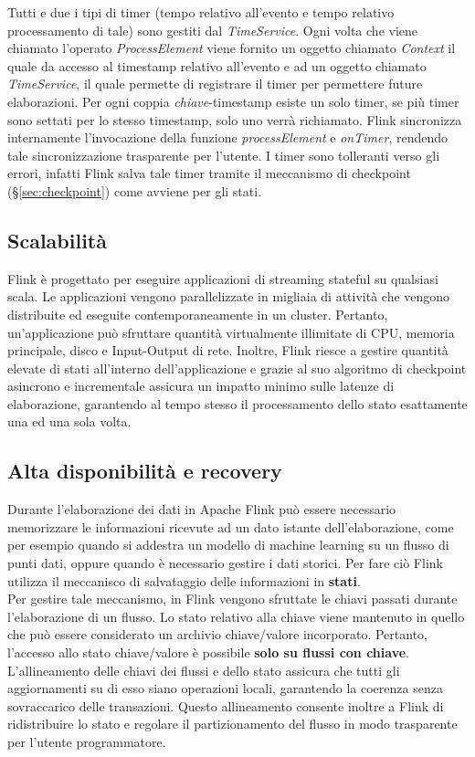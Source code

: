 \label{sec:timer}
Tutti e due i tipi di timer (tempo relativo all'evento e tempo relativo processamento di tale) sono gestiti dal \textit{TimeService}. Ogni volta che viene chiamato l'operato \textit{ProcessElement} viene fornito un oggetto chiamato \textit{Context} il quale da accesso al \gls{timestamp} relativo all'evento e ad un oggetto chiamato \textit{TimeService}, il quale permette di registrare il timer per permettere future elaborazioni. Per ogni coppia \textit{chiave}-\gls{timestamp} esiste un solo timer, se più timer sono settati per lo stesso \gls{timestamp}, solo uno verrà richiamato. Flink sincronizza internamente l'invocazione della funzione \textit{processElement} e \textit{onTimer}, rendendo tale sincronizzazione trasparente per l'utente. I timer sono tolleranti verso gli errori, infatti Flink salva tale timer tramite il meccanismo di checkpoint (\S\ref{sec:checkpoint}) come avviene per gli stati.


\subsection{Scalabilità}
Flink è progettato per eseguire applicazioni di streaming \gls{stateful} su qualsiasi scala. Le applicazioni vengono parallelizzate in migliaia di attività che vengono distribuite ed eseguite contemporaneamente in un \gls{cluster}. Pertanto, un'applicazione può sfruttare quantità virtualmente illimitate di CPU, memoria principale, disco e Input-Output di rete. Inoltre, Flink riesce a gestire quantità elevate di stati all'interno dell'applicazione e grazie al suo algoritmo di checkpoint asincrono e incrementale assicura un impatto minimo sulle latenze di elaborazione, garantendo al tempo stesso il processamento dello stato esattamente una ed una sola volta.

\subsection{Alta disponibilità e recovery}
Durante l'elaborazione dei dati in Apache Flink può essere necessario memorizzare le informazioni ricevute ad un dato istante dell'elaborazione, come per esempio quando si addestra un modello di machine learning su un flusso di punti dati, oppure quando è necessario gestire i dati storici. Per fare ciò Flink utilizza il meccanisco di salvataggio delle informazioni in \textbf{stati}.\\
Per gestire tale meccanismo, in Flink vengono sfruttate le chiavi passati durante l'elaborazione di un flusso. Lo stato relativo alla chiave viene mantenuto in quello che può essere considerato un archivio chiave/valore incorporato. Pertanto, l'accesso allo stato chiave/valore è possibile \textbf{solo su flussi con chiave}. L'allineamento delle chiavi dei flussi e dello stato assicura che tutti gli aggiornamenti su di esso siano operazioni locali, garantendo la coerenza senza sovraccarico delle transazioni. Questo allineamento consente inoltre a Flink di ridistribuire lo stato e regolare il partizionamento del flusso in modo trasparente per l'utente programmatore.

